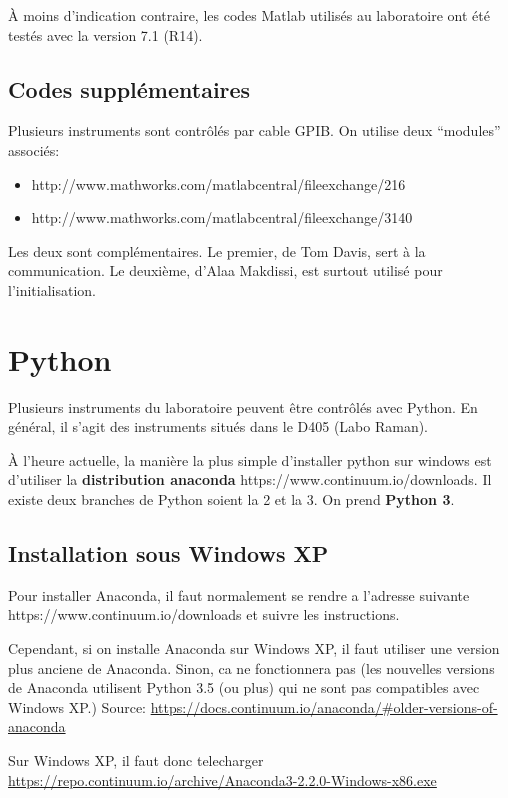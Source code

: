 \documentclass[11pt,francais]{book} %
\begin{document}
À moins d'indication contraire, les codes Matlab utilisés au laboratoire ont été testés avec la version 7.1 (R14).

\subsection{Codes supplémentaires}

Plusieurs instruments sont contrôlés par cable GPIB.
On utilise deux ``modules'' associés:
\begin{itemize}
\item http://www.mathworks.com/matlabcentral/fileexchange/216
\item http://www.mathworks.com/matlabcentral/fileexchange/3140
\label{tableModulesGPIBMatlab}
\end{itemize}
Les deux sont complémentaires.
Le premier, de Tom Davis, sert à la communication.
Le deuxième, d'Alaa Makdissi, est surtout utilisé pour l'initialisation.

\section{Python}

Plusieurs instruments du laboratoire peuvent être contrôlés avec Python.
En général, il s'agit des instruments situés dans le D405 (Labo Raman).

À l'heure actuelle, la manière la plus simple d'installer python sur windows est d'utiliser la {\bf distribution anaconda} https://www.continuum.io/downloads.
Il existe deux branches de Python soient la 2 et la 3. On prend {\bf Python 3}.

\subsection{Installation sous Windows XP}

	Pour installer Anaconda, il faut normalement se rendre a l'adresse suivante
	https://www.continuum.io/downloads
	et suivre les instructions.

	Cependant, si on installe Anaconda sur Windows XP, il faut utiliser une version plus anciene de Anaconda. 
	Sinon, ca ne fonctionnera pas (les nouvelles versions de Anaconda utilisent Python 3.5 (ou plus) qui ne sont pas compatibles avec Windows XP.)
	Source: \url{https://docs.continuum.io/anaconda/#older-versions-of-anaconda}

	Sur Windows XP, il faut donc telecharger
	\url{https://repo.continuum.io/archive/Anaconda3-2.2.0-Windows-x86.exe}
\end{document}
